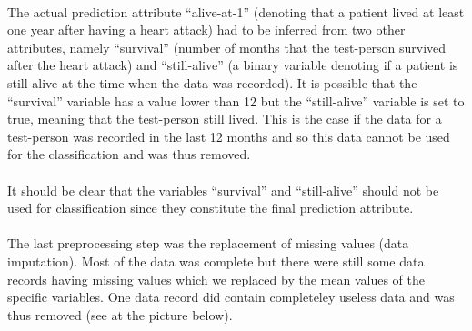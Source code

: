 \documentclass[paper=a4, fontsize=11pt]{scrartcl} %
\numberwithin{equation}{section} %
\numberwithin{figure}{section} %
\numberwithin{table}{section} %
\begin{document}
\paragraph{}The actual prediction attribute ``alive-at-1'' (denoting that a patient lived at least one year after having a heart attack) had to be inferred from two other attributes, namely ``survival'' (number of months that the test-person survived after the heart attack) and ``still-alive'' (a binary variable denoting if a patient is still alive at the time when the data was recorded). It is possible that the ``survival'' variable has a value lower than 12 but the ``still-alive'' variable is set to true, meaning that the test-person still lived. This is the case if the data for a test-person was recorded in the last 12 months and so this data cannot be used for the classification and was thus removed.

\paragraph{}It should be clear that the variables ``survival'' and ``still-alive'' should not be used for classification since they constitute the final prediction attribute.

\paragraph{}The last preprocessing step was the replacement of missing values (data imputation). Most of the data was complete but there were still some data records having missing values which we replaced by the mean values of the specific variables. One data record did contain completeley useless data and was thus removed (see at the picture below).

\paragraph{}

%
%
\end{document}
